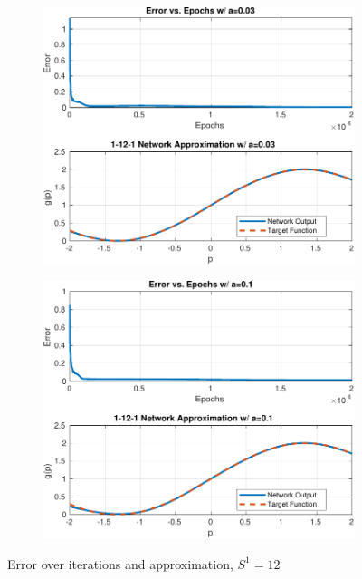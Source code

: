 \begin{figure}[htpb]
	\vspace{1cm}
	\begin{subfigure}{0.47\textwidth}
		\centering
		\includegraphics[width=\textwidth]{../Problem 4/nn_images/1-12-1_NN_a=0.03.pdf}
		\caption{}
	\end{subfigure}
	\hfill
	\begin{subfigure}{0.47\textwidth}
		\centering
		\includegraphics[width=\textwidth]{../Problem 4/nn_images/1-12-1_NN_a=0.1.pdf}
		\caption{}
	\end{subfigure}
	\caption{Error over iterations and approximation, $S^1=12$}
	\label{fig:prob4_1-12-1_error_output}
\end{figure}

